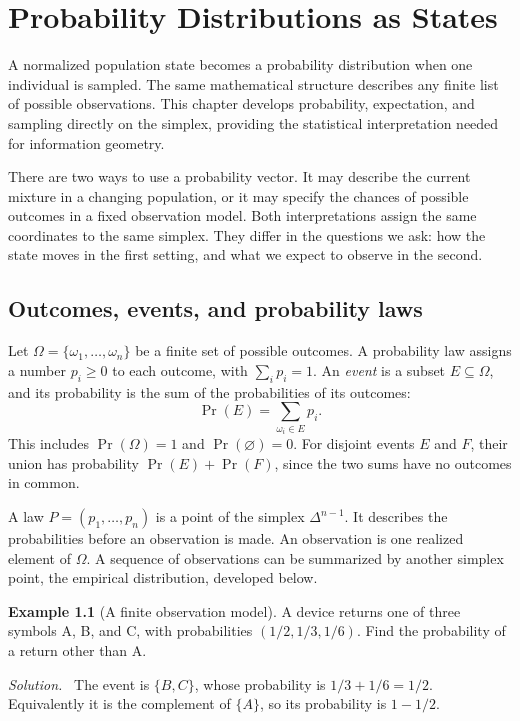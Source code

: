 \documentclass[11pt,oneside,openany]{book}
\theoremstyle{definition}
\newtheorem{example}{Example}[chapter]
\theoremstyle{remark}
\newenvironment{solution}{\par\smallskip\noindent\textit{Solution.}\ }{\par\smallskip}
\numberwithin{equation}{chapter}
\begin{document}
\mainmatter
\setcounter{chapter}{3}
\chapter{Probability Distributions as States}
\label{ch:probability}

A normalized population state becomes a probability distribution when one individual is sampled. The same mathematical structure describes any finite list of possible observations. This chapter develops probability, expectation, and sampling directly on the simplex, providing the statistical interpretation needed for information geometry.

There are two ways to use a probability vector. It may describe the current mixture in a changing population, or it may specify the chances of possible outcomes in a fixed observation model. Both interpretations assign the same coordinates to the same simplex. They differ in the questions we ask: how the state moves in the first setting, and what we expect to observe in the second.

\section{Outcomes, events, and probability laws}
Let $\Omega=\{\omega_1,\ldots,\omega_n\}$ be a finite set of possible outcomes. A probability law assigns a number $p_i\geq0$ to each outcome, with $\sum_i p_i=1$. An \emph{event} is a subset $E\subseteq\Omega$, and its probability is the sum of the probabilities of its outcomes:
\[
\Pr(E)=\sum_{\omega_i\in E}p_i.
\]
This includes $\Pr(\Omega)=1$ and $\Pr(\varnothing)=0$. For disjoint events $E$ and $F$, their union has probability $\Pr(E)+\Pr(F)$, since the two sums have no outcomes in common.

A law $P=(p_1,\ldots,p_n)$ is a point of the simplex $\Delta^{n-1}$. It describes the probabilities before an observation is made. An observation is one realized element of $\Omega$. A sequence of observations can be summarized by another simplex point, the empirical distribution, developed below.

\begin{example}[A finite observation model]
A device returns one of three symbols A, B, and C, with probabilities $(1/2,1/3,1/6)$. Find the probability of a return other than A.
\begin{solution}
The event is $\{B,C\}$, whose probability is $1/3+1/6=1/2$. Equivalently it is the complement of $\{A\}$, so its probability is $1-1/2$.
\end{solution}
\end{example}
\end{document}
